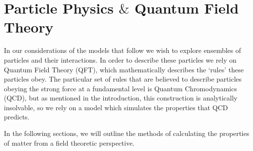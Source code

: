 \documentclass[11pt,a4paper,twoside]{carrollthesis}
\begin{document}
\chapter{Particle Physics $\&$ Quantum Field Theory}\label{sec:PPQFT}
%  
In our considerations of the models that follow we wish to explore
ensembles of particles and their interactions. In order to describe
these particles we rely on Quantum Field Theory (QFT), which
mathematically describes the `rules' these particles obey. The
particular set of rules that are believed to describe particles
obeying the strong force at a fundamental level is Quantum
Chromodynamics (QCD), but as mentioned in the introduction, this
construction is analytically insolvable, so we rely on a model which
simulates the properties that QCD predicts.\par
%
In the following sections, we will outline the methods of calculating
the properties of matter from a field theoretic perspective.
%
\end{document}
